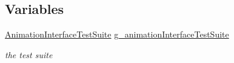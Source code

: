 \subsection*{Variables}
\begin{DoxyCompactItemize}
\item 
\hyperlink{classAnimationInterfaceTestSuite}{Animation\+Interface\+Test\+Suite} \hyperlink{group__netanim-test_ga6c3e8c675de6bf21d861d7aba4a6b276}{g\+\_\+animation\+Interface\+Test\+Suite}
\begin{DoxyCompactList}\small\item\em the test suite \end{DoxyCompactList}\end{DoxyCompactItemize}

